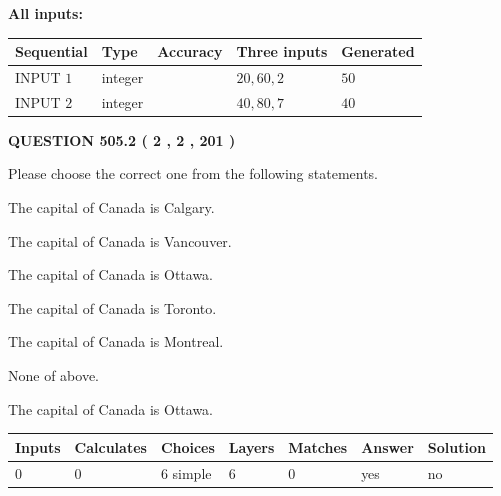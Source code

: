 \documentclass[12pt]{article}
\begin{document}
   
   
   
\noindent\vspace{0.1in}\hspace{-0.08in} {\textbf{\Large{All inputs: }}}
   
   
  
  
\noindent\begin{tabular}{|l|l|l|l|l|}
\hline
 Sequential & Type & Accuracy & Three inputs & Generated \\ 
\hline
 
 
  INPUT $  1 $ & integer &  & $
 20
 , 
 60
 , 
 2
 $ & $ 50 $ 
 \\  \hline  
 
 
  INPUT $  2 $ & integer &  & $
 40
 , 
 80
 , 
 7
 $ & $ 40 $ 
 \\  \hline  
 \end{tabular}
   
   
  
\vspace{0.2in}
  
{\textbf{\Large{QUESTION
505.2 
 ( 2 , 2 , 201 )
}}}
  
  
Please choose the correct one from the following statements.
 
 
The capital of Canada is Calgary.
 
 
The capital of Canada is Vancouver.
 
 
The capital of Canada is Ottawa.
 
 
The capital of Canada is Toronto.
 
 
The capital of Canada is Montreal.
 
 
 None of above.
 
 
\noindent{}
 
 
The capital of Canada is Ottawa.
 
 
\noindent{}
 
 
   
   
   
   
\noindent\begin{tabular}{|l|l|l|l|l|l|l|}
 \hline
Inputs & Calculates & Choices & Layers & Matches & Answer & Solution \\ \hline
 0  & 
 0  & 
 6
  simple  
  & 
 6  & 
 0  & 
  yes & 
  no 
  \\ \hline
 \end{tabular}
   
\end{document}
